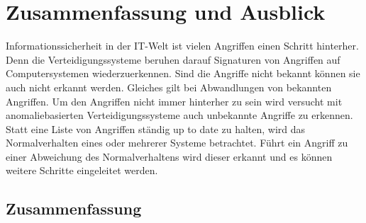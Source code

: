 \chapter{Zusammenfassung und Ausblick}

Informationssicherheit in der IT-Welt ist vielen Angriffen einen Schritt hinterher.
Denn die Verteidigungssysteme beruhen darauf Signaturen von Angriffen auf Computersystemen wiederzuerkennen.
Sind die  Angriffe nicht bekannt können sie auch nicht erkannt werden.
Gleiches gilt bei Abwandlungen von bekannten Angriffen.
Um den Angriffen nicht immer hinterher zu sein wird versucht mit anomaliebasierten Verteidigungssysteme auch unbekannte Angriffe zu erkennen.
Statt eine Liste von Angriffen ständig up to date zu halten, wird das Normalverhalten eines oder mehrerer Systeme betrachtet.
Führt ein Angriff zu einer Abweichung des Normalverhaltens wird dieser erkannt und es können weitere Schritte eingeleitet werden.

\section{Zusammenfassung}

